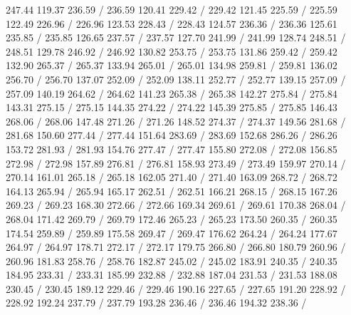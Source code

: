 { 247.44 119.37 236.59 /
 236.59 120.41 229.42 /
 229.42 121.45 225.59 /
 225.59 122.49 226.96 /
 226.96 123.53 228.43 /
 228.43 124.57 236.36 /
 236.36 125.61 235.85 /
 235.85 126.65 237.57 /
 237.57 127.70 241.99 /
 241.99 128.74 248.51 /
 248.51 129.78 246.92 /
 246.92 130.82 253.75 /
 253.75 131.86 259.42 /
 259.42 132.90 265.37 /
 265.37 133.94 265.01 /
 265.01 134.98 259.81 /
 259.81 136.02 256.70 /
 256.70 137.07 252.09 /
 252.09 138.11 252.77 /
 252.77 139.15 257.09 /
 257.09 140.19 264.62 /
 264.62 141.23 265.38 /
 265.38 142.27 275.84 /
 275.84 143.31 275.15 /
 275.15 144.35 274.22 /
 274.22 145.39 275.85 /
 275.85 146.43 268.06 /
 268.06 147.48 271.26 /
 271.26 148.52 274.37 /
 274.37 149.56 281.68 /
 281.68 150.60 277.44 /
 277.44 151.64 283.69 /
 283.69 152.68 286.26 /
 286.26 153.72 281.93 /
 281.93 154.76 277.47 /
 277.47 155.80 272.08 /
 272.08 156.85 272.98 /
 272.98 157.89 276.81 /
 276.81 158.93 273.49 /
 273.49 159.97 270.14 /
 270.14 161.01 265.18 /
 265.18 162.05 271.40 /
 271.40 163.09 268.72 /
 268.72 164.13 265.94 /
 265.94 165.17 262.51 /
 262.51 166.21 268.15 /
 268.15 167.26 269.23 /
 269.23 168.30 272.66 /
 272.66 169.34 269.61 /
 269.61 170.38 268.04 /
 268.04 171.42 269.79 /
 269.79 172.46 265.23 /
 265.23 173.50 260.35 /
 260.35 174.54 259.89 /
 259.89 175.58 269.47 /
 269.47 176.62 264.24 /
 264.24 177.67 264.97 /
 264.97 178.71 272.17 /
 272.17 179.75 266.80 /
 266.80 180.79 260.96 /
 260.96 181.83 258.76 /
 258.76 182.87 245.02 /
 245.02 183.91 240.35 /
 240.35 184.95 233.31 /
 233.31 185.99 232.88 /
 232.88 187.04 231.53 /
 231.53 188.08 230.45 /
 230.45 189.12 229.46 /
 229.46 190.16 227.65 /
 227.65 191.20 228.92 /
 228.92 192.24 237.79 /
 237.79 193.28 236.46 /
 236.46 194.32 238.36 /
}
